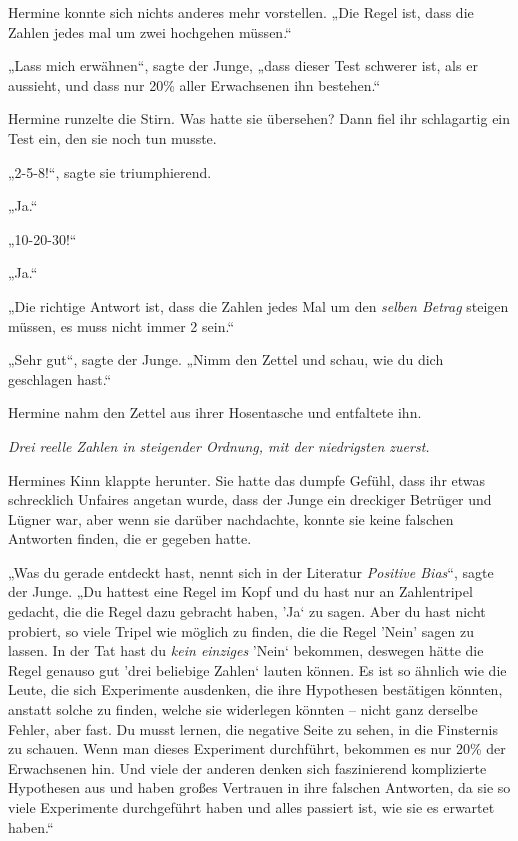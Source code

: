 {Hermine konnte sich nichts anderes mehr vorstellen. „Die Regel ist, dass die Zahlen jedes mal um zwei hochgehen müssen.“

„Lass mich erwähnen“, sagte der Junge, „dass dieser Test schwerer ist, als er aussieht, und dass nur 20\% aller Erwachsenen ihn bestehen.“

Hermine runzelte die Stirn. Was hatte sie übersehen? Dann fiel ihr schlagartig ein Test ein, den sie noch tun musste.

„2-5-8!“, sagte sie triumphierend.

„Ja.“

„10-20-30!“

„Ja.“

„Die richtige Antwort ist, dass die Zahlen jedes Mal um den \emph{selben Betrag} steigen müssen, es muss nicht immer 2 sein.“

„Sehr gut“, sagte der Junge. „Nimm den Zettel und schau, wie du dich geschlagen hast.“

Hermine nahm den Zettel aus ihrer Hosentasche und entfaltete ihn.

\emph{Drei reelle Zahlen in steigender Ordnung, mit der niedrigsten zuerst.}

Hermines Kinn klappte herunter. Sie hatte das dumpfe Gefühl, dass ihr etwas schrecklich Unfaires angetan wurde, dass der Junge ein dreckiger Betrüger und Lügner war, aber wenn sie darüber nachdachte, konnte sie keine falschen Antworten finden, die er gegeben hatte.

„Was du gerade entdeckt hast, nennt sich in der Literatur \emph{Positive Bias}“, sagte der Junge. „Du hattest eine Regel im Kopf und du hast nur an Zahlentripel gedacht, die die Regel dazu gebracht haben, 'Ja` zu sagen. Aber du hast nicht probiert, so viele Tripel wie möglich zu finden, die die Regel 'Nein' sagen zu lassen. In der Tat hast du \emph{kein einziges} 'Nein` bekommen, deswegen hätte die Regel genauso gut 'drei beliebige Zahlen` lauten können. Es ist so ähnlich wie die Leute, die sich Experimente ausdenken, die ihre Hypothesen bestätigen könnten, anstatt solche zu finden, welche sie widerlegen könnten -- nicht ganz derselbe Fehler, aber fast. Du musst lernen, die negative Seite zu sehen, in die Finsternis zu schauen. Wenn man dieses Experiment durchführt, bekommen es nur 20\% der Erwachsenen hin. Und viele der anderen denken sich faszinierend komplizierte Hypothesen aus und haben großes Vertrauen in ihre falschen Antworten, da sie so viele Experimente durchgeführt haben und alles passiert ist, wie sie es erwartet haben.“

}
